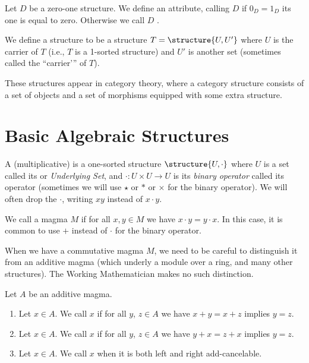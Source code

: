 \begin{definition}
Let $D$ be a zero-one structure. We define an attribute, calling
$D$  if $0_{D}=1_{D}$ its one is equal to
zero. Otherwise we call $D$ .
\end{definition}

\begin{definition}
We define a  structure to be a structure
$T=\structure{U,U'}$ where $U$ is the carrier of $T$ (i.e., $T$ is a
1-sorted structure) and $U'$ is another set (sometimes called the
``carrier'\thinspace'' of $T$).

These structures appear in category theory, where a category structure consists
of a set of objects and a set of morphisms equipped with some extra
structure. 
\end{definition}

\section{Basic Algebraic Structures}

\begin{definition}[Magmas]
A (multiplicative)  is a one-sorted structure
$\structure{U, \cdot}$ where $U$ is a set called its 
or \emph{Underlying Set}, and $\cdot\colon U\times U\to U$ is its
\emph{binary operator} called its  operator
(sometimes we will use $\star$ or $*$ or $\times$ for the binary
operator). We will often drop the $\cdot$, writing $xy$ instead of
$x\cdot y$.

We call a magma $M$  if for all $x,y\in M$ we have
$x\cdot y=y\cdot x$. In this case, it is common to use $+$ instead of
$\cdot$ for the binary operator. 
\end{definition}

\begin{remark}
When we have a commutative magma $M$, we need to be careful to
distinguish it from an additive magma (which underly a module over a
ring, and many other structures). The Working Mathematician makes no
such distinction.
\end{remark}

\begin{definition}
Let $A$ be an additive magma.
\begin{enumerate}
\item{} Let $x\in A$. We call $x$ 
  if for all $y$, $z\in A$ we have $x+y=x+z$ implies $y=z$.
\item{} Let $x\in A$. We call $x$ 
  if for all $y$, $z\in A$ we have $y+x=z+x$ implies $y=z$.
\item{} Let $x\in A$. We call $x$ 
  when it is both left and right add-cancelable.
\end{enumerate}
\end{definition}

